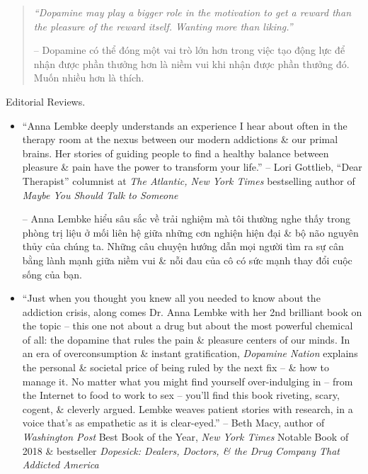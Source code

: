 \documentclass{article}
\begin{document}
\begin{enumerate}
\begin{quotation}
		{\it``Dopamine may play a bigger role in the motivation to get a reward than the pleasure of the reward itself. Wanting more than liking.''}
		
		-- Dopamine có thể đóng một vai trò lớn hơn trong việc tạo động lực để nhận được phần thưởng hơn là niềm vui khi nhận được phần thưởng đó. Muốn nhiều hơn là thích.
	\end{quotation}
	{\sf Editorial Reviews.}
	\begin{itemize}
		\item ``{\sc Anna Lembke} deeply understands an experience I hear about often in the therapy room at the nexus between our modern addictions \& our primal brains. Her stories of guiding people to find a healthy balance between pleasure \& pain have the power to transform your life.'' -- {\sc Lori Gottlieb}, ``Dear Therapist'' columnist at {\it The Atlantic, New York Times} bestselling author of {\it Maybe You Should Talk to Someone}
		
		-- {\sc Anna Lembke} hiểu sâu sắc về trải nghiệm mà tôi thường nghe thấy trong phòng trị liệu ở mối liên hệ giữa những cơn nghiện hiện đại \& bộ não nguyên thủy của chúng ta. Những câu chuyện hướng dẫn mọi người tìm ra sự cân bằng lành mạnh giữa niềm vui \& nỗi đau của cô có sức mạnh thay đổi cuộc sống của bạn.
		\item ``Just when you thought you knew all you needed to know about the addiction crisis, along comes Dr. {\sc Anna Lembke} with her 2nd brilliant book on the topic -- this one not about a drug but about the most powerful chemical of all: the dopamine that rules the pain \& pleasure centers of our minds. In an era of overconsumption \& instant gratification, {\it Dopamine Nation} explains the personal \& societal price of being ruled by the next fix -- \& how to manage it. No matter what you might find yourself over-indulging in -- from the Internet to food to work to sex -- you'll find this book riveting, scary, cogent, \& cleverly argued. Lembke weaves patient stories with research, in a voice that's as empathetic as it is clear-eyed.'' -- {\sc Beth Macy}, author of {\it Washington Post} Best Book of the Year, {\it New York Times} Notable Book of 2018 \& bestseller {\it Dopesick: Dealers, Doctors, \& the Drug Company That Addicted America}
		

\end{itemize}
\end{enumerate}
\end{document}
